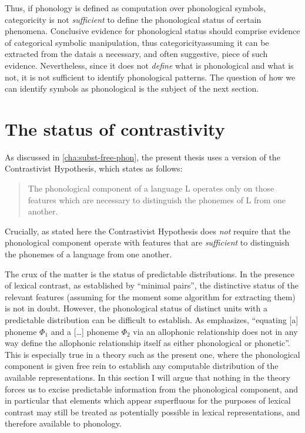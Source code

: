 Thus, if phonology is defined as computation over phonological symbols, categoricity is not \emph{sufficient} to define the phonological status of certain phenomena. Conclusive evidence for phonological status should comprise evidence of categorical symbolic manipulation, thus categoricity\dash assuming it can be extracted from the data\dash is a necessary, and often suggestive, piece of such evidence. Nevertheless, since it does not \emph{define} what is phonological and what is not, it is not sufficient to identify phonological patterns. The question of how we can identify symbols as phonological is the subject of the next section.

\section{The status of contrastivity}
\label{sec:status-contrastivity}

As discussed in \cref{cha:subst-free-phon}, the present thesis uses a version of the Contrastivist Hypothesis, which \citet[p.~20]{currie07} states as follows: \blockquote{The phonological component of a language L operates only on those features which are necessary to distinguish the phonemes of L from one another.} Crucially, as stated here the Contrastivist Hypothesis does \emph{not} require that the phonological component operate with features that are \emph{sufficient} to distinguish the phonemes of a language from one another.

The crux of the matter is the status of predictable distributions. In the presence of lexical contrast, as established by \enquote{minimal pairs}, the distinctive status of the relevant features (assuming for the moment some algorithm for extracting them) is not in doubt. However, the phonological status of distinct units with a predictable distribution can be difficult to establish. As \citet[p.~29]{scobbie07:_inter} emphasizes, \enquote{equating [a] phoneme $\Phi_{1}$ and a [\ldots] phoneme $\Phi_{2}$ via an allophonic relationship does not in any way define the allophonic relationship itself as either phonological or phonetic}. This is especially true in a theory such as the present one, where the phonological component is given free rein to establish any computable distribution of the available representations. In this section I will argue that nothing in the theory forces us to excise predictable information from the phonological component, and in particular that elements which appear superfluous for the purposes of lexical contrast may still be treated as potentially possible in lexical representations, and therefore available to phonology.

